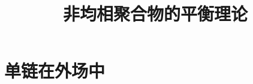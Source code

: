 \documentclass[12pt,a4paper]{article}
\title{非均相聚合物的平衡理论}
\author{}
\date{\chntoday}
\numberwithin{equation}{section}
\begin{document}
\maketitle
\section{}
\section{}
\section{单链在外场中}







\cite{tam19912d}

\end{document}
